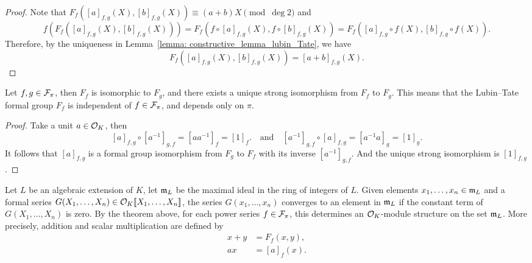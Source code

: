 \begin{proof}
    Note that $F_f([a]_{f,g}(X), [b]_{f,g}(X)) \equiv (a+b)X \pmod{\deg 2}$ and
    \begin{equation*}
        f(F_f([a]_{f,g}(X), [b]_{f,g}(X))) = F_f(f\circ [a]_{f,g}(X), f\circ [b]_{f,g}(X))
            = F_f([a]_{f,g}\circ f(X), [b]_{f,g}\circ f(X)).
    \end{equation*}
    Therefore, by the uniqueness in Lemma~\ref{lemma: constructive_lemma_lubin_Tate}, we have
    \[ F_f([a]_{f,g}(X), [b]_{f,g}(X)) = [a+b]_{f,g} (X).\]
\end{proof}

\begin{theorem}
    Let $f,g\in \mathcal{F}_\pi$, then $F_f$ is isomorphic to $F_g$, and there exists a unique strong
    isomorphism from $F_f$ to $F_g$. This means that the Lubin--Tate formal group $F_f$ is
    independent of $f \in \mathcal{F}_\pi$, and depends only on $\pi$.
    \label{thm: Lubin_Tate_independet_f_g}
\end{theorem}

\begin{proof}
    Take a unit $a \in \mathcal{O}_K$, then
    \[[a]_{f,g} \circ [a^{-1}]_{g,f} = [a a ^ {-1}]_f = [1]_f. \quad \text{and} \quad
    [a ^ {-1}]_{g,f} \circ [a]_{f,g} = [a^{-1}a]_g = [1]_g.
    \]
    It follows that $[a]_{f,g}$ is a formal group isomorphism from $F_g$ to $F_f$ with
    its inverse $[a^{-1}]_{g,f}$.
    And the unique strong isomorphism is
    $[1]_{f,g}$.
\end{proof}

\begin{remark}
    Let $L$ be an algebraic extension of $K$, let $\mathfrak{m}_L$ be the maximal ideal in the
    ring of integers of $L$. Given elements $x_1, \ldots, x_n \in \mathfrak{m}_L$ and a formal
    series $G(X_1, \ldots, X_n) \in \mathcal{O}_K[\![X_1, \ldots, X_n]\!]$, the series
    $G(x_1, \ldots, x_n)$ converges to an element in $\mathfrak{m}_L$ if the constant term of
    $G(X_1, \ldots, X_n)$ is zero. By the theorem above, for each power series $f\in \mathcal{F}_\pi$, this
    determines an $\mathcal{O}_K$-module structure on the set $\mathfrak{m}_L$. More precisely, addition
    and scalar multiplication are defined by
    \begin{align*}
        x + y &= F_f(x,y),  \\
        ax &= [a]_f (x).
    \end{align*}
    \label{rem: A-module}
\end{remark}

